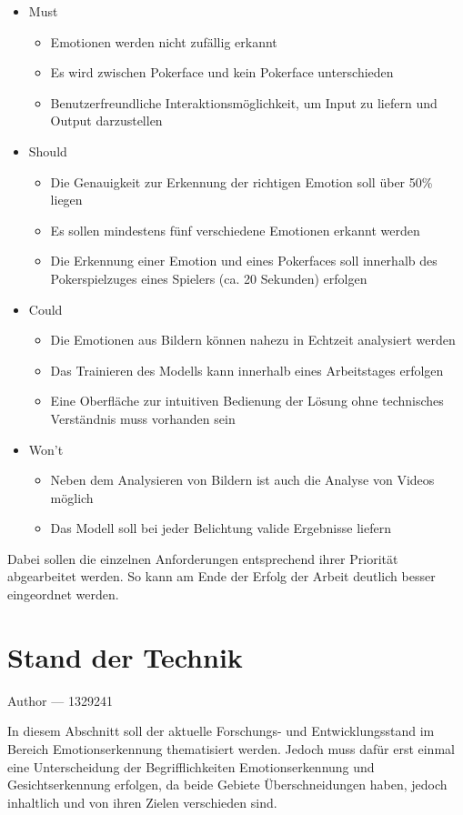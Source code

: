 \documentclass[12pt, a4paper]{report}
\makeatletter
\newcommand{\chapterauthor}[1]{%
  {\parindent0pt\vspace*{-25pt}%
  \large{Author --- }
  \linespread{1.1}\large\scshape#1%
  \par\nobreak\vspace*{35pt} }
  \@afterheading%
}
\makeatother
\begin{document}
\begin{itemize}
\item Must
\begin{itemize}
\item Emotionen werden nicht zufällig erkannt
\item Es wird zwischen Pokerface und kein Pokerface unterschieden
\item Benutzerfreundliche Interaktionsmöglichkeit, um Input zu liefern und Output darzustellen
\end{itemize}
\item Should
\begin{itemize}
\item Die Genauigkeit zur Erkennung der richtigen Emotion soll über 50\% liegen
\item Es sollen mindestens fünf verschiedene Emotionen erkannt werden
\item Die Erkennung einer Emotion und eines Pokerfaces soll innerhalb des Pokerspielzuges eines Spielers (ca. 20 Sekunden) erfolgen
\end{itemize}
\item Could
\begin{itemize}
\item Die Emotionen aus Bildern können nahezu in Echtzeit analysiert werden
\item Das Trainieren des Modells kann innerhalb eines Arbeitstages erfolgen
\item Eine Oberfläche zur intuitiven Bedienung der Lösung ohne technisches Verständnis muss vorhanden sein
\end{itemize}
\item Won't
\begin{itemize}
\item Neben dem Analysieren von Bildern ist auch die Analyse von Videos möglich
\item Das Modell soll bei jeder Belichtung valide Ergebnisse liefern
\end{itemize}
\end{itemize}
Dabei sollen die einzelnen Anforderungen entsprechend ihrer Priorität abgearbeitet werden. So kann am Ende der Erfolg der Arbeit deutlich besser eingeordnet werden.

\let\cleardoublepage\relax

\chapter{Stand der Technik}
\chapterauthor{1329241}
In diesem Abschnitt soll der aktuelle Forschungs- und Entwicklungsstand im Bereich Emotionserkennung thematisiert werden. Jedoch muss dafür erst einmal eine Unterscheidung der Begrifflichkeiten Emotionserkennung und Gesichtserkennung erfolgen, da beide Gebiete Überschneidungen haben, jedoch inhaltlich und von ihren Zielen verschieden sind.
\end{document}

